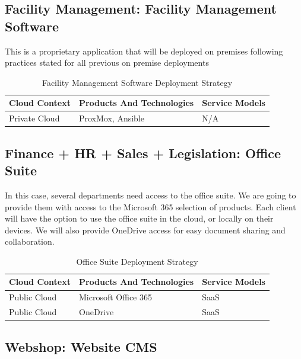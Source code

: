\documentclass{llncs}
\begin{document}
\subsection{Facility Management: Facility Management Software}
This is a proprietary application that will be deployed on premises following practices stated for all previous on premise deployments\\
\begin{table}[h!]
    \centering
    \begin{tabular}{lll}
        \hline
        \textbf{Cloud Context} & \textbf{Products And Technologies} & \textbf{Service Models} \\
        \hline
        Private Cloud          & ProxMox, Ansible                   & N/A                     \\
        \hline
    \end{tabular}
    \caption{Facility Management Software Deployment Strategy}
\end{table}

\subsection{Finance + HR + Sales + Legislation: Office Suite}
In this case, several departments need access to the office suite. We are going to provide them with access to the Microsoft 365 selection of products.
Each client will have the option to use the office suite in the cloud, or locally on their devices. We will also provide OneDrive access for easy document sharing and collaboration.\\

\begin{table}[h!]
    \centering
    \begin{tabular}{lll}
        \hline
        \textbf{Cloud Context} & \textbf{Products And Technologies} & \textbf{Service Models} \\
        \hline
        Public Cloud           & Microsoft Office 365               & SaaS                    \\
        \hline
        Public Cloud           & OneDrive                           & SaaS                    \\
        \hline
    \end{tabular}
    \caption{Office Suite Deployment Strategy}
\end{table}

\subsection{Webshop: Website CMS}
\end{document}
